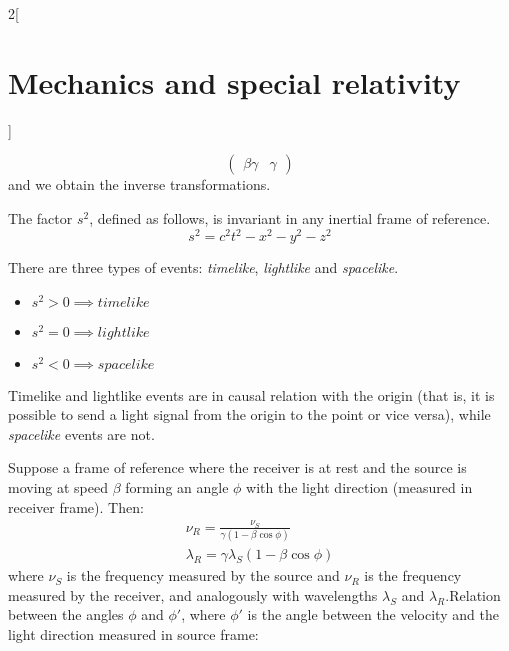 \documentclass[../../../main.tex]{subfiles}
\begin{document}
\begin{multicols}{2}[\section{Mechanics and special relativity}]
\begin{prop}
$$\begin{pmatrix}
                \beta\gamma & \gamma
            \end{pmatrix}$$ and we obtain the inverse transformations.
    \end{prop}
    \begin{prop}
        The factor $s^2$, defined as follows, is invariant in any inertial frame of reference. $$s^2=c^2t^2-x^2-y^2-z^2$$
    \end{prop}
    \begin{prop}
        There are three types of events: \textit{timelike}, \textit{lightlike} and \textit{spacelike}.
        \begin{itemize}
            \item $s^2>0\implies\mathit{timelike}$
            \item $s^2=0\implies\mathit{lightlike}$
            \item $s^2<0\implies\mathit{spacelike}$
        \end{itemize}
        Timelike and lightlike events are in causal relation with the origin (that is, it is possible to send a light signal from the origin to the point or vice versa), while \textit{spacelike} events are not.
    \end{prop}
    \begin{center}
        \begin{minipage}{\linewidth}
            \centering
            
        \end{minipage}
    \end{center}
    \begin{prop}
        Suppose a frame of reference where the receiver is at rest and the source is moving at speed $\beta$ forming an angle $\phi$ with the light direction (measured in receiver frame). Then:
        \begin{gather}
            \label{dopp1}\nu_R=\frac{\nu_S}{\gamma(1-\beta\cos\phi)}\\
            \lambda_R=\gamma\lambda_S(1-\beta\cos\phi)
        \end{gather} where $\nu_S$ is the frequency measured by the source and $\nu_R$ is the frequency measured by the receiver, and analogously with wavelengths $\lambda_S$ and $\lambda_R$.\newline Relation between the angles $\phi$ and $\phi'$, where $\phi'$ is the angle between the velocity and the light direction measured in source frame:

\end{prop}
\end{multicols}
\end{document}
